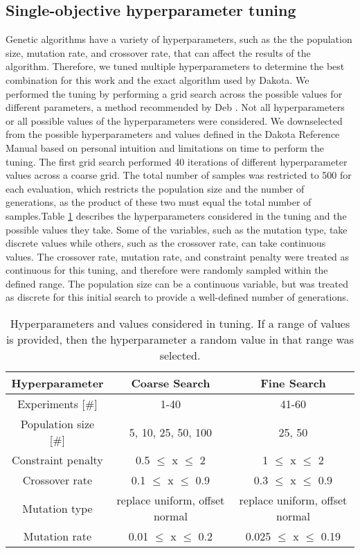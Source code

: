 \subsection{Single-objective hyperparameter tuning}
Genetic algorithms have a variety of hyperparameters, such as the the 
population size, mutation rate, and crossover rate, that can affect 
the results of the algorithm. Therefore, we tuned multiple hyperparameters
to determine the best combination for this work and the exact algorithm 
used by Dakota. We performed the tuning by performing a grid search across 
the possible values for different parameters, a method recommended 
by Deb \cite{deb_multi-objective_2001}. Not all hyperparameters or 
all possible values of the hyperparameters were considered. We downselected from 
the possible hyperparameters and values defined in the Dakota Reference 
Manual based on personal intuition and limitations on time to perform 
the tuning. The 
first grid search performed 40 iterations of different hyperparameter 
values across a coarse grid. The total number of samples was restricted to 
500 for each evaluation, which restricts the population size and the 
number of generations, as the product of these two must equal the 
total number of samples.Table \ref{tab:soga_tuning} describes 
the hyperparameters considered in the tuning and the possible 
values they take. Some of the variables, such as the mutation 
type, take discrete values while others, such as the crossover 
rate, can take continuous values. The crossover rate, mutation 
rate, and constraint penalty were treated as continuous for this 
tuning, and therefore were randomly sampled within the defined range. 
The population size can be a continuous variable, but was 
treated as discrete for this initial search to provide a well-defined 
number of generations.

\begin{table}
    \centering 
    \caption{Hyperparameters and values considered in tuning. If a range 
    of values is provided, then the hyperparameter a random value in 
    that range was selected.}
    \label{tab:soga_tuning}
    \begin{tabular}{c c c}
        \hline
        Hyperparameter & Coarse Search & Fine Search \\
        \hline 
        Experiments [\#] & 1-40 & 41-60 \\
        Population size [\#] & 5, 10, 25, 50, 100 & 25, 50\\
        Constraint penalty & 0.5 $\leq$ x $\leq$ 2 & 1 $\leq$ x $\leq$ 2\\
        Crossover rate & 0.1 $\leq$ x $\leq$ 0.9 & 0.3 $\leq$ x $\leq$ 0.9\\
        Mutation type & replace uniform, offset normal & replace uniform, offset normal\\
        Mutation rate & 0.01 $\leq$ x $\leq$ 0.2 & 0.025 $\leq$ x $\leq$ 0.19\\
        \hline       
    \end{tabular}
\end{table}


